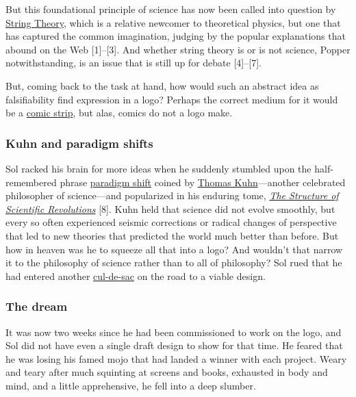 \documentclass[
  12pt,
  british,
  a4paper,
]{article}
\begin{document}
But this foundational principle of science has now been called into
question by
\href{https://www.britannica.com/science/string-theory}{String Theory},
which is a relative newcomer to theoretical physics, but one that has
captured the common imagination, judging by the popular explanations
that abound on the Web {[}1{]}--{[}3{]}. And whether string theory is or
is not science, Popper notwithstanding, is an issue that is still up for
debate {[}4{]}--{[}7{]}.

But, coming back to the task at hand, how would such an abstract idea as
falsifiability find expression in a logo? Perhaps the correct medium for
it would be a
\href{https://www.explainxkcd.com/wiki/index.php/2078:_Popper}{comic
strip}, but alas, comics do not a logo make.

\hypertarget{kuhn-and-paradigm-shifts}{%
\subsubsection{Kuhn and paradigm
shifts}\label{kuhn-and-paradigm-shifts}}

Sol racked his brain for more ideas when he suddenly stumbled upon the
half-remembered phrase
\href{https://www.lexico.com/definition/paradigm_shift}{paradigm shift}
coined by \href{https://en.wikipedia.org/wiki/Thomas_Kuhn}{Thomas
Kuhn}---another celebrated philosopher of science---and popularized in
his enduring tome,
\href{https://www.amazon.com/Structure-Scientific-Revolutions-50th-Anniversary/dp/0226458121/}{\emph{The
Structure of Scientific Revolutions}} {[}8{]}. Kuhn held that science
did not evolve smoothly, but every so often experienced seismic
corrections or radical changes of perspective that led to new theories
that predicted the world much better than before. But how in heaven was
he to squeeze all that into a logo? And wouldn't that narrow it to the
philosophy of science rather than to all of philosophy? Sol rued that he
had entered another
\href{https://www.merriam-webster.com/dictionary/cul-de-sac}{cul-de-sac}
on the road to a viable design.

\hypertarget{the-dream}{%
\subsubsection{The dream}\label{the-dream}}

It was now two weeks since he had been commissioned to work on the logo,
and Sol did not have even a single draft design to show for that time.
He feared that he was losing his famed mojo that had landed a winner
with each project. Weary and teary after much squinting at screens and
books, exhausted in body and mind, and a little apprehensive, he fell
into a deep slumber.
\end{document}
